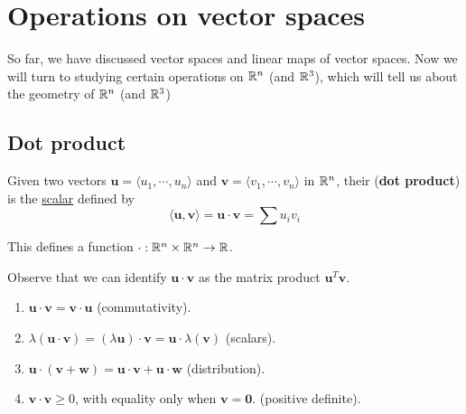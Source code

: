 \section{Operations on vector spaces}\label{operations}

So far, we have discussed vector spaces and linear maps of vector spaces. Now we will turn to studying certain operations on $\mathbb{R}^n$ (and $\mathbb{R}^3$), which will tell us about the geometry of $\mathbb{R}^n$ (and $\mathbb{R}^3$)

\subsection{Dot product}

\begin{definition}
    Given two vectors $\bm{u} = \langle u_1, \cdots, u_n \rangle$ and $\bm{v}  = \langle v_1 , \cdots, v_n \rangle$ in $\mathbb{R}^n$, their (\textbf{dot product}) is the \underline{scalar} defined by $$\langle \bm{u}, \bm{v}\rangle = \bm{u} \cdot \bm{v} = \sum u_iv_i$$
    
    This defines a function $\cdot: \mathbb{R}^n \times \mathbb{R}^n \to \mathbb{R}$.
    
    \end{definition}


\begin{remark}
Observe that we can identify $\bm{u} \cdot \bm{v}$ as the matrix product $\bm{u}^{T} \bm{v}$.
\end{remark}



\begin{theorem}
    
    \begin{enumerate}
        \item $\bm{u} \cdot \bm{v} = \bm{v} \cdot \bm{u}$ (commutativity).
        \item $\lambda(\bm{u} \cdot \bm{v}) = (\lambda\bm{u}) \cdot \bm{v} = \bm{u} \cdot \lambda(\bm{v})$ (scalars).
        \item $\bm{u} \cdot (\bm{v} + \bm{w}) = \bm{u} \cdot \bm{v} + \bm{u} \cdot \bm{w}$ (distribution).
        \item $\bm{v} \cdot \bm{v} \geq 0$, with equality only when $\bm{v} = \bm{0}$. (positive definite).  
    \end{enumerate}
    
    \end{theorem}




